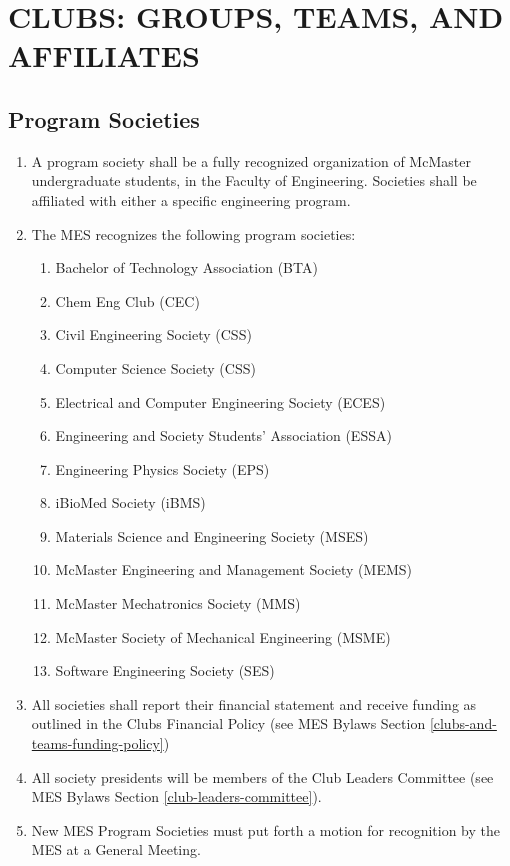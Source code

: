 \hypertarget{clubs-groups-teams-and-affiliates}{%
 \section{CLUBS: GROUPS, TEAMS, AND AFFILIATES}
 \label{clubs-groups-teams-and-affiliates}}

\hypertarget{program-societies}{%
 \subsection{Program Societies}
 \label{program-societies}}
\begin{enumerate}
 \item
  A program society shall be a fully recognized organization of McMaster
  undergraduate students, in the Faculty of Engineering. Societies shall
  be affiliated with either a specific engineering program.
 \item
  The MES recognizes the following program societies:

  \begin{enumerate}
   \item
    Bachelor of Technology Association (BTA)
   \item
    Chem Eng Club (CEC)
   \item
    Civil Engineering Society (CSS)
   \item
    Computer Science Society (CSS)
   \item
    Electrical and Computer Engineering Society (ECES)
   \item
    Engineering and Society Students' Association (ESSA)
   \item
    Engineering Physics Society (EPS)
   \item
    iBioMed Society (iBMS)
   \item
    Materials Science and Engineering Society (MSES)
   \item
    McMaster Engineering and Management Society (MEMS)
   \item
    McMaster Mechatronics Society (MMS)
   \item
    McMaster Society of Mechanical Engineering (MSME)
   \item
    Software Engineering Society (SES)
  \end{enumerate}
 \item
  All societies shall report their financial statement and receive
  funding as outlined in the Clubs Financial Policy (see MES Bylaws
  Section \ref{clubs-and-teams-funding-policy})
 \item
  All society presidents will be members of the Club Leaders Committee
  (see MES Bylaws Section \ref{club-leaders-committee}).
 \item
  New MES Program Societies must put forth a motion for recognition by
  the MES at a General Meeting.

\end{enumerate}

